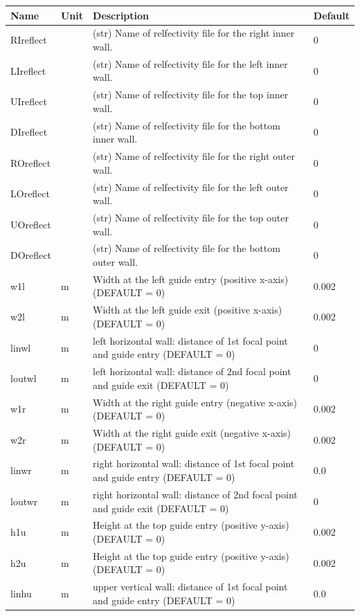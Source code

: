 \begin{longtable}{p{}p{}p{}p{}}
\toprule
\textbf{Name} & \textbf{Unit} & \textbf{Description} & \textbf{Default} \\
\midrule
\endhead
RIreflect &  & (str)  Name of relfectivity file for the right inner wall. & 0 \\
LIreflect &  & (str)  Name of relfectivity file for the left inner wall. & 0 \\
UIreflect &  & (str)  Name of relfectivity file for the top inner wall. & 0 \\
DIreflect &  & (str)  Name of relfectivity file for the bottom inner wall. & 0 \\
ROreflect &  & (str)  Name of relfectivity file for the right outer wall. & 0 \\
LOreflect &  & (str)  Name of relfectivity file for the left outer wall. & 0 \\
UOreflect &  & (str)  Name of relfectivity file for the top outer wall. & 0 \\
DOreflect &  & (str)  Name of relfectivity file for the bottom outer wall. & 0 \\
w1l & m & Width at the left guide entry    (positive x-axis) (DEFAULT = 0) & 0.002 \\
w2l & m & Width at the left guide exit     (positive x-axis) (DEFAULT = 0) & 0.002 \\
linwl & m & left horizontal wall: distance of 1st focal point and guide entry (DEFAULT = 0) & 0 \\
loutwl & m & left horizontal wall: distance of 2nd focal point and guide exit  (DEFAULT = 0) & 0 \\
w1r & m & Width at the right guide entry   (negative x-axis) (DEFAULT = 0) & 0.002 \\
w2r & m & Width at the right guide exit    (negative x-axis) (DEFAULT = 0) & 0.002 \\
linwr & m & right horizontal wall: distance of 1st focal point and guide entry (DEFAULT = 0) & 0.0 \\
loutwr & m & right horizontal wall: distance of 2nd focal point and guide exit (DEFAULT = 0) & 0 \\
h1u & m & Height at the top guide entry    (positive y-axis) (DEFAULT = 0) & 0.002 \\
h2u & m & Height at the top guide entry    (positive y-axis) (DEFAULT = 0) & 0.002 \\
linhu & m & upper vertical wall: distance of 1st focal point and guide entry (DEFAULT = 0) & 0.0 \\

\end{longtable}
